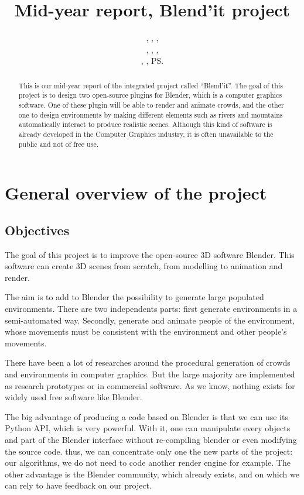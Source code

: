 \documentclass[a4paper,11pt]{article}
\title{Mid-year report, Blend'it project}
\author{\bb, \gc, \dl,\\ \vl, \om, \mr,\\ \me, \js, \ps}
\begin{document}
\maketitle

\begin{abstract}
This is our mid-year  report of the integrated project called ``Blend'it''. The goal of this project is to design two open-source plugins for Blender, which is a computer graphics software. One of these plugin will be able to render and animate crowds, and the other one to design environments by making different elements such as rivers and mountains automatically interact to produce realistic scenes. Although this kind of software is already developed in the Computer Graphics industry, it is often unavailable to the public and not of free use.
\end{abstract}


\tableofcontents

\newpage

\section{General overview of the project}

\subsection{Objectives}
The goal of this project is to improve the open-source 3D software Blender. This software can create 3D scenes from scratch, from modelling to animation and render.

The aim is to add to Blender the possibility to generate large populated environments. There are two independents parts: first generate environments in a semi-automated way. Secondly, generate and animate people of the environment, whose movements must be consistent with the environment and other people's movements.

There have been a lot of researches around the procedural generation of crowds and environments in computer graphics. But the large majority are implemented as research prototypes or in commercial software. As we know, nothing exists for widely used free software like Blender.

The big advantage of producing a code based on Blender is that we can use its Python API, which is very powerful. With it, one can manipulate every objects and part of the Blender interface without re-compiling blender or even modifying the source code. thus, we can concentrate only one the new parts of the project: our algorithms, we do not need to code another render engine for example.
The other advantage is the Blender community, which already exists, and on which we can rely to have feedback on our project.
\end{document}
